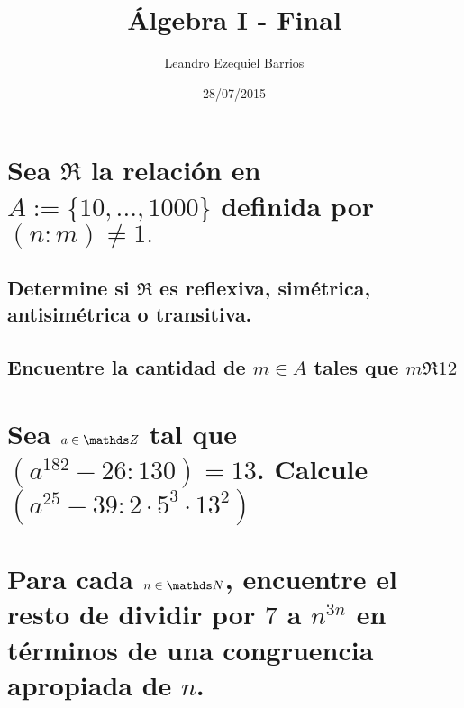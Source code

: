 \documentclass[a4paper,spanish]{article}
\begin{document}
\title{Álgebra I - Final}
\author{Leandro Ezequiel Barrios}
\date{28/07/2015}
\maketitle

\section{%
  Sea $\mathfrak{R}$ la relación en $A := \{10, ..., 1000\}$ %
  definida por $(n:m) \neq 1.$%
}

\subsection{Determine si $\mathfrak{R}$ es reflexiva, simétrica, antisimétrica o transitiva.}
\subsection{Encuentre la cantidad de $m \in A$ tales que $m \mathfrak{R} 12$}

\section{%
  Sea $a \in \Z$ tal que $(a^{182}-26:130) = 13$. %
  Calcule $(a^{25}-39:2 \cdot 5^3 \cdot 13^2)$%
}

\section{%
  Para cada $n \in \N$, encuentre el resto de dividir por $7$ a $n^{3n}$%
  en términos de una congruencia apropiada de $n$.%
}
\end{document}
